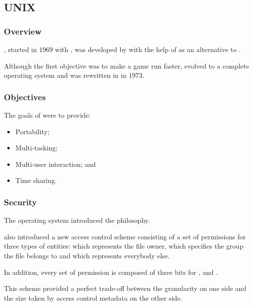 
\subsection{UNIX}


\begin{frame}
  \frametitle{Overview}

  , started in $1969$ with , was developed by
   with the help of  as an alternative
  to .

  \-

  Although the first objective was to make a game run faster, 
  evolved to a complete operating system and was rewritten in 
  in $1973$.
\end{frame}


\begin{frame}
  \frametitle{Objectives}

  The goals of  were to provide:

  \begin{itemize}
    \item
      Portability;
    \item
      Multi-tasking;
    \item
      Multi-user interaction; and
    \item
      Time sharing.
  \end{itemize}
\end{frame}


\begin{frame}
  \frametitle{Security}

  The  operating system introduced the 
  philosophy.

  \-

   also introduced a new access control scheme consisting of a
  set of permissions for three types of entities:  which represents
  the file owner,  which specifies the group the file belongs
  to and  which represents everybody else.

  \-

  In addition, every set of permission is composed of three bits 
  for ,  and .

  \-

  This scheme provided a perfect trade-off between the granularity on one
  side and the size taken by access control metadata on the other side.
\end{frame}

